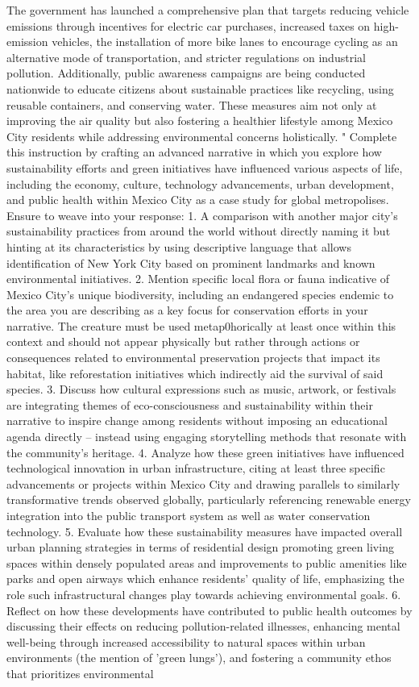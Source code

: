 \documentclass[12pt, a4paper]{article}
\begin{document}
The government has launched a comprehensive plan that targets reducing vehicle emissions through incentives for electric car purchases, increased taxes on high-emission vehicles, the installation of more bike lanes to encourage cycling as an alternative mode of transportation, and stricter regulations on industrial pollution. Additionally, public awareness campaigns are being conducted nationwide to educate citizens about sustainable practices like recycling, using reusable containers, and conserving water. These measures aim not only at improving the air quality but also fostering a healthier lifestyle among Mexico City residents while addressing environmental concerns holistically. " Complete this instruction by crafting an advanced narrative in which you explore how sustainability efforts and green initiatives have influenced various aspects of life, including the economy, culture, technology advancements, urban development, and public health within Mexico City as a case study for global metropolises. Ensure to weave into your response: 1. A comparison with another major city's sustainability practices from around the world without directly naming it but hinting at its characteristics by using descriptive language that allows identification of New York City based on prominent landmarks and known environmental initiatives. 2. Mention specific local flora or fauna indicative of Mexico City’s unique biodiversity, including an endangered species endemic to the area you are describing as a key focus for conservation efforts in your narrative. The creature must be used metap0horically at least once within this context and should not appear physically but rather through actions or consequences related to environmental preservation projects that impact its habitat, like reforestation initiatives which indirectly aid the survival of said species. 3. Discuss how cultural expressions such as music, artwork, or festivals are integrating themes of eco-consciousness and sustainability within their narrative to inspire change among residents without imposing an educational agenda directly – instead using engaging storytelling methods that resonate with the community's heritage. 4. Analyze how these green initiatives have influenced technological innovation in urban infrastructure, citing at least three specific advancements or projects within Mexico City and drawing parallels to similarly transformative trends observed globally, particularly referencing renewable energy integration into the public transport system as well as water conservation technology. 5. Evaluate how these sustainability measures have impacted overall urban planning strategies in terms of residential design promoting green living spaces within densely populated areas and improvements to public amenities like parks and open airways which enhance residents' quality of life, emphasizing the role such infrastructural changes play towards achieving environmental goals. 6. Reflect on how these developments have contributed to public health outcomes by discussing their effects on reducing pollution-related illnesses, enhancing mental well-being through increased accessibility to natural spaces within urban environments (the mention of 'green lungs'), and fostering a community ethos that prioritizes environmental 
\end{document}
